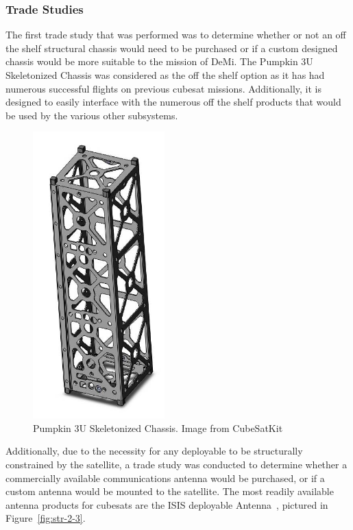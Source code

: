 \documentclass[12pt]{article}
\begin{document}
\subsubsection{Trade Studies}
The first trade study that was performed was to determine whether or not an off the shelf structural chassis would need to be purchased or if a custom designed chassis would be more suitable to the mission of DeMi. The Pumpkin 3U Skeletonized Chassis was considered as the off the shelf option as it has had numerous successful flights on previous cubesat missions. Additionally, it is designed to easily interface with the numerous off the shelf products that would be used by the various other subsystems.

\begin{figure}[!ht]
\centering
\includegraphics[width=2in]{images/STR-1.jpg}
\caption{Pumpkin 3U Skeletonized Chassis. Image from CubeSatKit\cite{cubesatkit}}
\label{fig:str-1}
\end{figure}

Additionally, due to the necessity for any deployable to be structurally constrained by the satellite, a trade study was conducted to determine whether a commercially available communications antenna would be purchased, or if a custom antenna would be mounted to the satellite. The most readily available antenna products for cubesats are the ISIS deployable Antenna~\cite{cubesatshop}, pictured in Figure~\ref{fig:str-2-3}.
\end{document}
